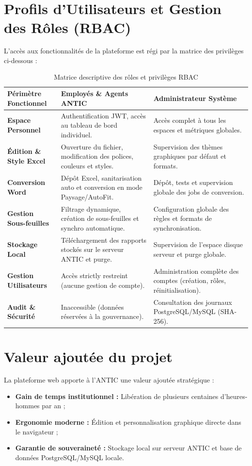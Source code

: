 \section{Profils d'Utilisateurs et Gestion des Rôles (RBAC)}

L'accès aux fonctionnalités de la plateforme est régi par la matrice des privilèges ci-dessous :

\begin{table}[H]
\centering
\small
\renewcommand{\arraystretch}{1.3}
\begin{tabular}{|L{3.5cm}|L{5.8cm}|L{5.8cm}|}
\hline
{}
\textbf{Périmètre Fonctionnel} & \textbf{Employés \& Agents ANTIC} & \textbf{Administrateur Système} \\
\hline
\textbf{Espace Personnel} & Authentification JWT, accès au tableau de bord individuel. & Accès complet à tous les espaces et métriques globales. \\
\hline
\textbf{Édition \& Style Excel} & Ouverture du fichier, modification des polices, couleurs et styles. & Supervision des thèmes graphiques par défaut et formats. \\
\hline
\textbf{Conversion Word} & Dépôt Excel, sanitarisation auto et conversion en mode Paysage/AutoFit. & Dépôt, tests et supervision globale des jobs de conversion. \\
\hline
\textbf{Gestion Sous-feuilles} & Filtrage dynamique, création de sous-feuilles et synchro automatique. & Configuration globale des règles et formats de synchronisation. \\
\hline
\textbf{Stockage Local} & Téléchargement des rapports stockés sur le serveur ANTIC et purge. & Supervision de l'espace disque serveur et purge globale. \\
\hline
\textbf{Gestion Utilisateurs} & Accès strictly restreint (aucune gestion de compte). & Administration complète des comptes (création, rôles, réinitialisation). \\
\hline
\textbf{Audit \& Sécurité} & Inaccessible (données réservées à la gouvernance). & Consultation des journaux PostgreSQL/MySQL (SHA-256). \\
\hline
\end{tabular}
\caption{Matrice descriptive des rôles et privilèges RBAC}
\label{tab:matrice_rbac}
\end{table}

\section{Valeur ajoutée du projet}

La plateforme web apporte à l'ANTIC une valeur ajoutée stratégique :
\begin{itemize}
    \item \textbf{Gain de temps institutionnel :} Libération de plusieurs centaines d'heures-hommes par an ;
    \item \textbf{Ergonomie moderne :} Édition et personnalisation graphique directe dans le navigateur ;
    \item \textbf{Garantie de souveraineté :} Stockage local sur serveur ANTIC et base de données PostgreSQL/MySQL locale.
\end{itemize}

